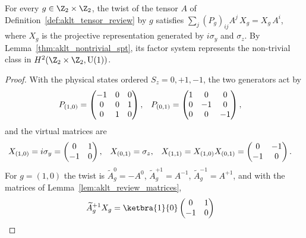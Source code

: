 \begin{theorem}%
    \label{thm:aklt_review_spt}
    \leanok
    For every $g\in\Z_2\times\Z_2$, the twist of the tensor $A$ of
    Definition~\ref{def:aklt_tensor_review} by $g$ satisfies
    $\sum_j (P_g)_{ij}A^{j}\,X_g=X_g\,A^{i}$, where $X_g$ is the projective
    representation generated by $i\sigma_y$ and $\sigma_z$. By
    Lemma~\ref{thm:aklt_nontrivial_spt}, its factor system represents the
    non-trivial class in $H^2(\Z_2\times\Z_2,\mathrm{U}(1))$.
\end{theorem}
\begin{proof}
    \leanok
    With the physical states ordered $S_z=0,+1,-1$, the two generators act by
    \begin{align}
        P_{(1,0)} & = \begin{pmatrix}-1&0&0\\0&0&1\\0&1&0\end{pmatrix},
                  & P_{(0,1)}                                           & = \begin{pmatrix}1&0&0\\0&-1&0\\0&0&-1\end{pmatrix},
        \notag
    \end{align}
    and the virtual matrices are
    \begin{align}
        X_{(1,0)} & = i\sigma_y = \begin{pmatrix}0&1\\-1&0\end{pmatrix},
                  & X_{(0,1)}                                            & = \sigma_z,
                  & X_{(1,1)}                                            & = X_{(1,0)}X_{(0,1)} = \begin{pmatrix}0&-1\\-1&0\end{pmatrix}.
        \notag
    \end{align}
    For $g=(1,0)$ the twist is $\widetilde A_g^{0}=-A^{0}$,
    $\widetilde A_g^{+1}=A^{-1}$, $\widetilde A_g^{-1}=A^{+1}$, and with the
    matrices of Lemma~\ref{lem:aklt_review_matrices},
    \begin{align}
        \widetilde A_g^{+1}X_g
         & = \ketbra{1}{0}\begin{pmatrix}0&1\\-1&0\end{pmatrix}

\end{align}
\end{proof}
